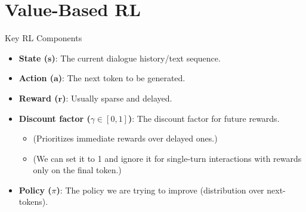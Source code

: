 \documentclass[aspectratio=169]{beamer}
\begin{document}
\section{Value-Based RL}

\begin{frame}{Key RL Components}
  \begin{itemize}[<+->]
    \item \textbf{State ($\mathbf{s}$)}: The current dialogue history/text sequence.
    \item \textbf{Action ($\mathbf{a}$)}: The next token to be generated.
    \item \textbf{Reward ($\mathbf{r}$)}: Usually sparse and delayed.%
    \item \textbf{Discount factor ($\gamma \in [0,1]$)}: The discount factor for future rewards.
        \begin{itemize}
            \item (Prioritizes immediate rewards over delayed ones.)
            \item (We can set it to 1 and ignore it for single-turn interactions with rewards only on the final token.)
        \end{itemize}
    \item \textbf{Policy ($\pi$)}: The policy we are trying to improve (distribution over next-tokens).
  \end{itemize}
\end{frame}
\end{document}
